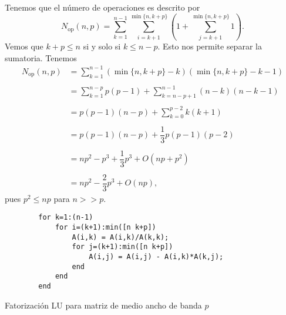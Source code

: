 Tenemos que el n\'umero de operaciones es descrito por
\[
    N_\mathrm{op}(n,p) = \sum_{k=1}^{n-1} \sum_{i=k+1}^{\min\{n, k+p\}} \left( 1 + \sum_{j=k+1}^{\min\{n, k+p\}} 1 \right).
\]
Vemos que $k+p\leq n$ si y solo si $k\leq n-p$. Esto nos permite separar la sumatoria. Tenemos \[
    \begin{array}{rl} N_\mathrm{op}(n,p) & = \sum_{k=1}^{n-1} (\min\{n, k+p\} - k)(\min\{n, k+p\} -k-1)\\ & \\ &= \sum_{k=1}^{n-p} p(p-1) + \sum_{k=n-p+1}^{n-1} (n - k)(n -k-1)\\ & \\ & = p(p-1)(n-p) + \sum_{k=0}^{p-2} k(k+1)\\ & \\ & =  p(p-1)(n-p) + \dfrac{1}{3}p(p-1)(p-2)\\ & \\
    & = np^2 -p^3 + \dfrac{1}{3}p^3 + O(np + p^2)\\ & \\
    & = np^2 - \dfrac{2}{3}p^3 + O(np),\end{array}
\]
pues \(p^2\leq np\) para \(n>>p\).

\begin{listing}[hb!]
    \begin{verbatim}
        for k=1:(n-1)
            for i=(k+1):min([n k+p])
                A(i,k) = A(i,k)/A(k,k);
                for j=(k+1):min([n k+p])
                    A(i,j) = A(i,j) - A(i,k)*A(k,j);
                end
            end
        end
    \end{verbatim}
    \caption{Fatorizaci\'on LU para matriz de medio ancho de banda \(p\)}
    \label{code:lu-band}
\end{listing}